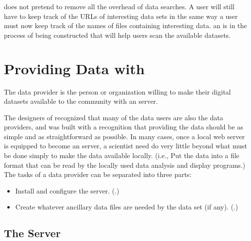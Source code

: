 \opendap does not pretend to remove all the overhead of data searches. A
user will still have to keep track of the URLs of interesting data
sets in the same way a user must now keep track of the names of files
containing interesting data.  an \opendap {} is in the
process of being constructed that will help users scan the available
datasets.  

\section{Providing Data with \opendap}

The \opendap data provider is the person or organization willing to make
their digital datasets available to the community with an \opendap server.

The designers of \opendap recognized that many of the data users are also
the data providers, and \opendap was built with a recognition that
providing the data should be as simple and as straightforward as
possible. In many cases, once a local web server is equipped to become
an \opendap server, a scientist need do very little beyond what must
be done simply to make the data available locally. (i.e., Put the data
into a file format that can be read by the locally used data analysis
and display programs.) The tasks of a data provider can be separated
into three parts:

\begin{itemize}
\item Install and configure the \opendap server.
  (.)

\item Create whatever ancillary data files are needed by the data
set (if any). (.)



\end{itemize}

\subsection{The \opendap Server}
\label{intro,opd-server}

